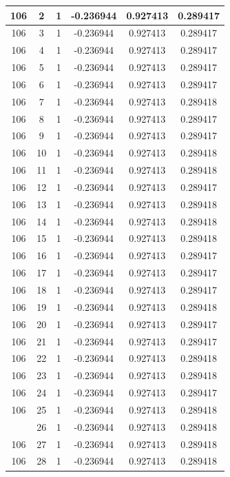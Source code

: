 \documentclass[12pt,a4paper]{article}
\numberwithin{equation}{section}
\numberwithin{figure}{section}
\numberwithin{table}{section}
\begin{document}
\begin{longtable}{|c|c|c|c|c|c|}
106 & 2 & 1 & -0.236944 & 0.927413 & 0.289417 \\ \hline
106 & 3 & 1 & -0.236944 & 0.927413 & 0.289417 \\ \hline
106 & 4 & 1 & -0.236944 & 0.927413 & 0.289417 \\ \hline
106 & 5 & 1 & -0.236944 & 0.927413 & 0.289417 \\ \hline
106 & 6 & 1 & -0.236944 & 0.927413 & 0.289417 \\ \hline
106 & 7 & 1 & -0.236944 & 0.927413 & 0.289418 \\ \hline
106 & 8 & 1 & -0.236944 & 0.927413 & 0.289417 \\ \hline
106 & 9 & 1 & -0.236944 & 0.927413 & 0.289417 \\ \hline
106 & 10 & 1 & -0.236944 & 0.927413 & 0.289418 \\ \hline
106 & 11 & 1 & -0.236944 & 0.927413 & 0.289418 \\ \hline
106 & 12 & 1 & -0.236944 & 0.927413 & 0.289417 \\ \hline
106 & 13 & 1 & -0.236944 & 0.927413 & 0.289418 \\ \hline
106 & 14 & 1 & -0.236944 & 0.927413 & 0.289418 \\ \hline
106 & 15 & 1 & -0.236944 & 0.927413 & 0.289418 \\ \hline
106 & 16 & 1 & -0.236944 & 0.927413 & 0.289417 \\ \hline
106 & 17 & 1 & -0.236944 & 0.927413 & 0.289417 \\ \hline
106 & 18 & 1 & -0.236944 & 0.927413 & 0.289417 \\ \hline
106 & 19 & 1 & -0.236944 & 0.927413 & 0.289418 \\ \hline
106 & 20 & 1 & -0.236944 & 0.927413 & 0.289417 \\ \hline
106 & 21 & 1 & -0.236944 & 0.927413 & 0.289417 \\ \hline
106 & 22 & 1 & -0.236944 & 0.927413 & 0.289418 \\ \hline
106 & 23 & 1 & -0.236944 & 0.927413 & 0.289418 \\ \hline
106 & 24 & 1 & -0.236944 & 0.927413 & 0.289417 \\ \hline
106 & 25 & 1 & -0.236944 & 0.927413 & 0.289418 \\ \hline
\pagebreak
106 & 26 & 1 & -0.236944 & 0.927413 & 0.289418 \\ \hline
106 & 27 & 1 & -0.236944 & 0.927413 & 0.289418 \\ \hline
106 & 28 & 1 & -0.236944 & 0.927413 & 0.289418 \\ \hline

\end{longtable}
\end{document}
